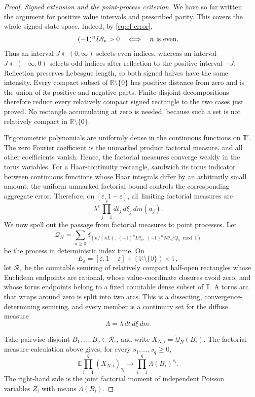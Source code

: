\documentclass[11pt]{article}
\numberwithin{equation}{section}
\theoremstyle{definition}
\newcommand{\T}{\mathbb T}
\newcommand{\R}{\mathbb R}
\newcommand{\E}{\mathbb E}
\newcommand{\1}{\mathbf 1}
\begin{document}
\begin{proof}
\medskip
\noindent\emph{Signed extension and the point-process criterion.}
We have so far written the argument for positive value intervals and
prescribed parity.  This covers the whole signed state space.  Indeed,
by \eqref{eq:cf-error},
\[
 (-1)^nL\theta_n>0
 \quad\Longleftrightarrow\quad n\ \hbox{is even}.
\]
Thus an interval \(J\Subset(0,\infty)\) selects even indices, whereas
an interval \(J\Subset(-\infty,0)\) selects odd indices after reflection
to the positive interval \(-J\).  Reflection preserves Lebesgue length,
so both signed halves have the same intensity.  Every compact subset of
\(\R\setminus\{0\}\) has positive distance from zero and is the union
of its positive and negative parts.  Finite disjoint decompositions
therefore reduce every relatively compact signed rectangle to the two
cases just proved.  No rectangle accumulating at zero is needed,
because such a set is not relatively compact in
\(\R\setminus\{0\}\).

Trigonometric polynomials are uniformly dense in the continuous
functions on \(\T^r\).  The zero Fourier coefficient is the unmarked
product factorial measure, and all other coefficients vanish.  Hence,
the factorial measures converge weakly in the torus variables.  For a
Haar-continuity rectangle, sandwich its torus indicator between continuous
functions whose Haar integrals differ by an arbitrarily small amount; the
uniform unmarked factorial bound controls the corresponding aggregate
error.  Therefore,
on \([\varepsilon,1-\varepsilon]\), all limiting factorial measures
are
\[
 \lambda^r\prod_{j=1}^r dt_j\,d\xi_j\,dm(u_j).
\]
We now spell out the passage from factorial measures to point
processes.  Let
\[
 \widetilde{\mathcal Q}_N
 =
 \sum_{n\ge0}
 \delta_{\left(n/(\kappa L),\;(-1)^nL\theta_n,\;
                    (-1)^nN\theta_n/Q_n\bmod1\right)}
\]
be the process in deterministic index time.  On
\[
 E_\varepsilon
 =[\varepsilon,1-\varepsilon]
  \times(\R\setminus\{0\})\times\T,
\]
let \(\mathscr R_\varepsilon\) be the countable semiring of relatively
compact half-open rectangles whose Euclidean endpoints are rational,
whose value-coordinate closures avoid zero, and whose torus endpoints
belong to a fixed countable dense subset of \(\T\).  A torus arc that
wraps around zero is split into two arcs.  This is a dissecting,
convergence-determining semiring, and every member is a continuity set
for the diffuse measure
\[
 \Lambda=\lambda\,dt\,d\xi\,dm.
\]

Take pairwise disjoint
\(B_1,\ldots,B_q\in\mathscr R_\varepsilon\), and write
\(X_{N,i}=\widetilde{\mathcal Q}_N(B_i)\).  The
factorial-measure calculation above
gives, for every \(s_1,\ldots,s_q\ge0\),
\begin{equation}\label{eq:joint-count-factorial-moments}
 \E\prod_{i=1}^q(X_{N,i})_{s_i}
 \longrightarrow
 \prod_{i=1}^q\Lambda(B_i)^{s_i}.
\end{equation}
The right-hand side is the joint factorial moment of independent
Poisson variables \(Z_i\) with means \(\Lambda(B_i)\).


\end{proof}
\end{document}
